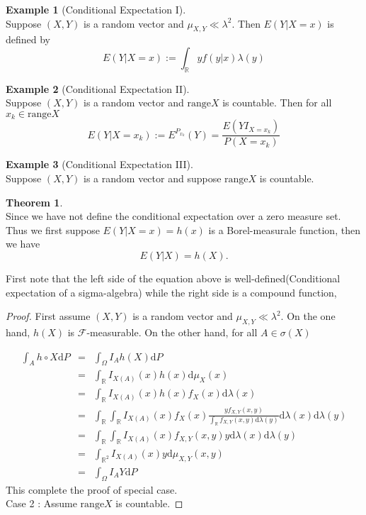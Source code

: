 \documentclass[12pt]{book}
\theoremstyle{definition}
\newtheorem{example}{Example}[chapter]
\newtheorem{theorem}{Theorem}[chapter]
\newcommand{\R}{\mathbb{R}}
\newcommand{\D}{\mathrm{d}}
\begin{document}
\begin{example}[Conditional Expectation I] \ \\
Suppose $(X,Y)$ is a random vector and $\mu_{X,Y} \ll \lambda^2$. Then $E(Y|X=x)$ is defined by
$$
E(Y|X=x) := \int_\R yf(y|x) \lambda(y)
$$
\end{example}

\begin{example}[Conditional Expectation II] \ \\
Suppose $(X,Y)$ is a random vector and $\mathrm{range} X$ is countable. Then for all $x_k\in \mathrm{range} X$
$$
E(Y|X=x_k) := E^{P_{x_k}}(Y)=\frac{E(YI_{X=x_k})}{P(X=x_k)}
$$ 
\end{example}

\begin{example}[Conditional Expectation III] \ \\
Suppose $(X,Y)$ is a random vector and suppose $\mathrm{range} X$ is countable.	
\end{example}




\begin{theorem} \ \\
Since we have not define the conditional expectation over a zero measure set. Thus we first suppose $E(Y|X=x)=h(x)$ is a Borel-measurale function, then we have
$$
E(Y|X) = h(X).
$$	
\end{theorem} \par
First note that the left side of the equation above is well-defined(Conditional expectation of a sigma-algebra) while the right side is a compound function,
\begin{proof}
First assume $(X,Y)$ is a random vector and $\mu_{X,Y} \ll \lambda^2$. On the one hand, $h(X)$ is $\mathcal F$-measurable.
On the other hand, for all $A \in \sigma(X)$

\begin{eqnarray*}
\int_A h\circ X \D P &=& \int_\Omega I_A h(X) \D P	\\
&=& \int_\R I_{X(A)}(x)h(x) \D \mu_X(x) \\
&=& \int_\R I_{X(A)}(x)h(x)f_X(x) \D \lambda(x) \\
&=& \int_\R \int_\R I_{X(A)}(x)f_X(x)\frac{yf_{X,Y}(x,y)}{\int_{\R}f_{X,Y}(x,y)\D \lambda(y)}\D\lambda(x) \D \lambda(y) \\
&=& \int_\R \int_\R I_{X(A)}(x)f_{X,Y}(x,y)y \D \lambda(x) \D \lambda(y) \\ 
&=& \int_{\R^2} I_{X(A)}(x)y\D \mu_{X,Y}(x,y) \\
&=& \int_\Omega I_A Y\D P
\end{eqnarray*}
This complete the proof of special case. \\
Case 2 : Assume $\mathrm{range} X$ is countable. 
\end{proof}
\end{document}
